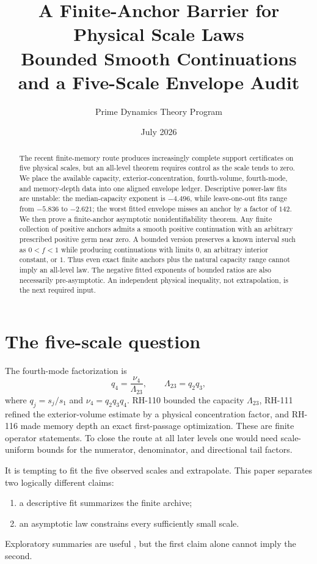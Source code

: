 \documentclass[12pt]{article}
\title{A Finite-Anchor Barrier for Physical Scale Laws\\\large Bounded Smooth Continuations and a Five-Scale Envelope Audit}
\author{Prime Dynamics Theory Program}
\date{July 2026}
\begin{document}
\maketitle

\begin{abstract}
The recent finite-memory route produces increasingly complete support
certificates on five physical scales, but an all-level theorem requires
control as the scale tends to zero.  We place the available capacity,
exterior-concentration, fourth-volume, fourth-mode, and memory-depth data into
one aligned envelope ledger.  Descriptive power-law fits are unstable: the
median-capacity exponent is $-4.496$, while leave-one-out fits range from
$-5.836$ to $-2.621$; the worst fitted envelope misses an anchor by a factor
of $142$.  We then prove a finite-anchor asymptotic nonidentifiability
theorem.  Any finite collection of positive anchors admits a smooth positive
continuation with an arbitrary prescribed positive germ near zero.  A
bounded version preserves a known interval such as $0<f<1$ while producing
continuations with limits $0$, an arbitrary interior constant, or $1$.
Thus even exact finite anchors plus the natural capacity range cannot imply
an all-level law.  The negative fitted exponents of bounded ratios are also
necessarily pre-asymptotic.  An independent physical inequality, not
extrapolation, is the next required input.
\end{abstract}

\section{The five-scale question}
The fourth-mode factorization is
\[
 q_4=\frac{\nu_4}{\Lambda_{23}},\qquad
 \Lambda_{23}=q_2q_3,
\]
where $q_j=s_j/s_1$ and $\nu_4=q_2q_3q_4$.  RH-110 bounded the capacity
$\Lambda_{23}$, RH-111 refined the exterior-volume estimate by a physical
concentration factor, and RH-116 made memory depth an exact first-passage
optimization.  These are finite operator statements.  To close the route at
all later levels one would need scale-uniform bounds for the numerator,
denominator, and directional tail factors.

It is tempting to fit the five observed scales and extrapolate.  This paper
separates two logically different claims:
\begin{enumerate}
 \item a descriptive fit summarizes the finite archive;
 \item an asymptotic law constrains every sufficiently small scale.
\end{enumerate}
Exploratory summaries are useful \citep{Tukey1977}, but the first claim alone
cannot imply the second.
\end{document}
